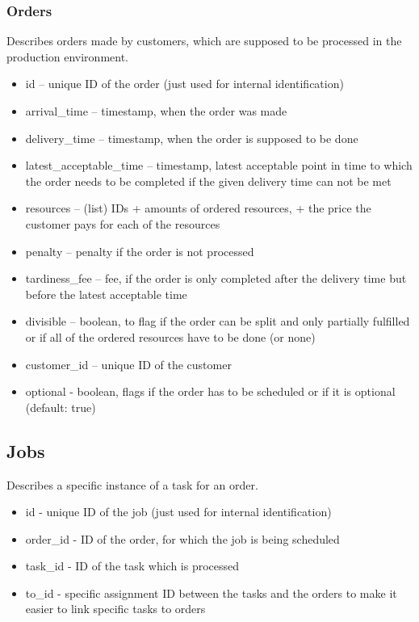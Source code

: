 \documentclass[a4paper,12pt,twoside]{scrreprt}
\begin{document}
\subsubsection{Orders}
Describes orders made by customers, which are supposed to be processed in the production environment.
\begin{itemize}
	\item id – unique ID of the order (just used for internal identification)
	\item arrival\_time – timestamp, when the order was made
	\item delivery\_time – timestamp, when the order is supposed to be done
	\item latest\_acceptable\_time – timestamp, latest acceptable point in time to which the order needs to be completed if the given delivery time can not be met
	\item resources – (list) IDs + amounts of ordered resources, + the price the customer pays for each of the resources
	\item penalty – penalty if the order is not processed
	\item tardiness\_fee – fee, if the order is only completed after the delivery time but before the latest acceptable time
	\item divisible – boolean, to flag if the order can be split and only partially fulfilled or if all of the ordered resources have to be done (or none)
	\item customer\_id – unique ID of the customer
	\item optional - boolean, flags if the order has to be scheduled or if it is optional (default: true)
\end{itemize}

\subsection{Jobs}
Describes a specific instance of a task for an order.

\begin{itemize}
	\item id - unique ID of the job (just used for internal identification)
	\item order\_id - ID of the order, for which the job is being scheduled
	\item task\_id - ID of the task which is processed
	\item to\_id - specific assignment ID between the tasks and the orders to make it easier to link specific tasks to orders
\end{itemize}
\end{document}
